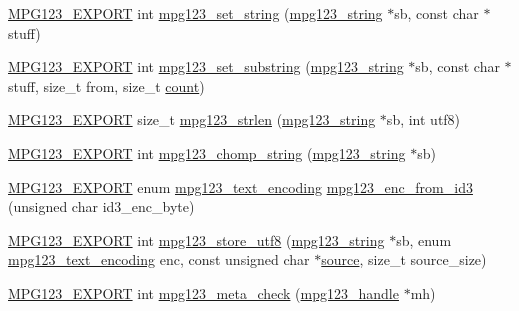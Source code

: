 \begin{DoxyCompactItemize}
\item 
\mbox{\hyperlink{mpg123_8h_a2ba98cfba3f760879df70e755b2a61cc}{M\+P\+G123\+\_\+\+E\+X\+P\+O\+RT}} int \mbox{\hyperlink{group__mpg123__metadata_ga96e9070d26d63c02c3f22caa0d339f26}{mpg123\+\_\+set\+\_\+string}} (\mbox{\hyperlink{structmpg123__string}{mpg123\+\_\+string}} $\ast$sb, const char $\ast$stuff)
\item 
\mbox{\hyperlink{mpg123_8h_a2ba98cfba3f760879df70e755b2a61cc}{M\+P\+G123\+\_\+\+E\+X\+P\+O\+RT}} int \mbox{\hyperlink{group__mpg123__metadata_ga37b68d834755647a4ef227b0dd4b5c2a}{mpg123\+\_\+set\+\_\+substring}} (\mbox{\hyperlink{structmpg123__string}{mpg123\+\_\+string}} $\ast$sb, const char $\ast$stuff, size\+\_\+t from, size\+\_\+t \mbox{\hyperlink{_s_d_l__opengl_8h_a619bc20e8198de3bd3f3d7fc34de66b2}{count}})
\item 
\mbox{\hyperlink{mpg123_8h_a2ba98cfba3f760879df70e755b2a61cc}{M\+P\+G123\+\_\+\+E\+X\+P\+O\+RT}} size\+\_\+t \mbox{\hyperlink{group__mpg123__metadata_ga556c8eb6c2ee4b88d744dcf20dffa83b}{mpg123\+\_\+strlen}} (\mbox{\hyperlink{structmpg123__string}{mpg123\+\_\+string}} $\ast$sb, int utf8)
\item 
\mbox{\hyperlink{mpg123_8h_a2ba98cfba3f760879df70e755b2a61cc}{M\+P\+G123\+\_\+\+E\+X\+P\+O\+RT}} int \mbox{\hyperlink{group__mpg123__metadata_gad149639f724347c8c420c8551ea3d4c2}{mpg123\+\_\+chomp\+\_\+string}} (\mbox{\hyperlink{structmpg123__string}{mpg123\+\_\+string}} $\ast$sb)
\item 
\mbox{\hyperlink{mpg123_8h_a2ba98cfba3f760879df70e755b2a61cc}{M\+P\+G123\+\_\+\+E\+X\+P\+O\+RT}} enum \mbox{\hyperlink{group__mpg123__metadata_ga489b4cd5fb8d1d826e38b09bed9294ce}{mpg123\+\_\+text\+\_\+encoding}} \mbox{\hyperlink{group__mpg123__metadata_gabd394947d8cca46e49a0e07926bb2369}{mpg123\+\_\+enc\+\_\+from\+\_\+id3}} (unsigned char id3\+\_\+enc\+\_\+byte)
\item 
\mbox{\hyperlink{mpg123_8h_a2ba98cfba3f760879df70e755b2a61cc}{M\+P\+G123\+\_\+\+E\+X\+P\+O\+RT}} int \mbox{\hyperlink{group__mpg123__metadata_ga5800cb8b5886969982a695258d80f342}{mpg123\+\_\+store\+\_\+utf8}} (\mbox{\hyperlink{structmpg123__string}{mpg123\+\_\+string}} $\ast$sb, enum \mbox{\hyperlink{group__mpg123__metadata_ga489b4cd5fb8d1d826e38b09bed9294ce}{mpg123\+\_\+text\+\_\+encoding}} enc, const unsigned char $\ast$\mbox{\hyperlink{_s_d_l__opengl__glext_8h_a633906574fe6e39b7f2840bed0e49832}{source}}, size\+\_\+t source\+\_\+size)
\item 
\mbox{\hyperlink{mpg123_8h_a2ba98cfba3f760879df70e755b2a61cc}{M\+P\+G123\+\_\+\+E\+X\+P\+O\+RT}} int \mbox{\hyperlink{group__mpg123__metadata_ga1cd6279a1273f63eb8dcc8a554d815bb}{mpg123\+\_\+meta\+\_\+check}} (\mbox{\hyperlink{group__mpg123__init_ga6728e2839a395f3a07d4514da659faca}{mpg123\+\_\+handle}} $\ast$mh)

\end{DoxyCompactItemize}
